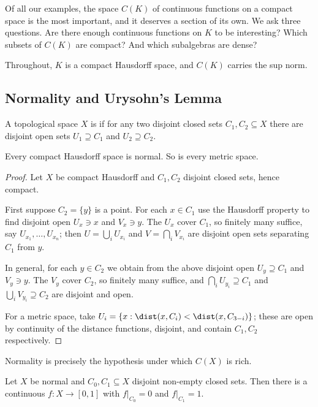 Of all our examples, the space $C(K)$ of continuous functions on a compact space is the most important, and it deserves a section of its own. We ask three questions. Are there enough continuous functions on $K$ to be interesting? Which subsets of $C(K)$ are compact? And which subalgebras are dense?

Throughout, $K$ is a compact Hausdorff space, and $C(K)$ carries the sup norm.

\subsection{Normality and Urysohn's Lemma}

\begin{definition}
	A topological space $X$ is  if for any two disjoint closed sets $C_1, C_2 \subseteq X$ there are disjoint open sets $U_1 \supseteq C_1$ and $U_2 \supseteq C_2$.
\end{definition}

\begin{proposition}
	Every compact Hausdorff space is normal. So is every metric space.
\end{proposition}

\begin{proof}
	Let $X$ be compact Hausdorff and $C_1, C_2$ disjoint closed sets, hence compact.

	First suppose $C_2 = \{y\}$ is a point. For each $x \in C_1$ use the Hausdorff property to find disjoint open $U_x \ni x$ and $V_x \ni y$. The $U_x$ cover $C_1$, so finitely many suffice, say $U_{x_1},\dots,U_{x_n}$; then $U = \bigcup_i U_{x_i}$ and $V = \bigcap_i V_{x_i}$ are disjoint open sets separating $C_1$ from $y$.

	In general, for each $y \in C_2$ we obtain from the above disjoint open $U_y \supseteq C_1$ and $V_y \ni y$. The $V_y$ cover $C_2$, so finitely many suffice, and $\bigcap_i U_{y_i} \supseteq C_1$ and $\bigcup_i V_{y_i} \supseteq C_2$ are disjoint and open.

	For a metric space, take $U_i = \{x : \dist(x,C_i) < \dist(x,C_{3-i})\}$; these are open by continuity of the distance functions, disjoint, and contain $C_1, C_2$ respectively.
\end{proof}

Normality is precisely the hypothesis under which $C(X)$ is rich.

\begin{lemma}
	Let $X$ be normal and $C_0, C_1 \subseteq X$ disjoint non-empty closed sets. Then there is a continuous $f : X \to [0,1]$ with $f|_{C_0} = 0$ and $f|_{C_1} = 1$.
\end{lemma}

